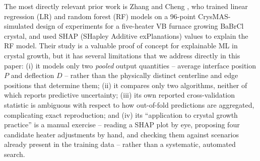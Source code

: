 \documentclass[conference]{IEEEtran}
\begin{document}
The most directly relevant prior work is Zhang and Cheng \cite{zhang_cheng2022}, who trained linear regression (LR) and random forest (RF) models on a 96-point CrysMAS-simulated design of experiments for a five-heater VB furnace growing BaBrCl crystal, and used SHAP (SHapley Additive exPlanations) values to explain the RF model. Their study is a valuable proof of concept for explainable ML in crystal growth, but it has several limitations that we address directly in this paper: (i) it models only two \emph{pooled} output quantities -- average interface position $P$ and deflection $D$ -- rather than the physically distinct centerline and edge positions that determine them; (ii) it compares only two algorithms, neither of which reports predictive uncertainty; (iii) its own reported cross-validation statistic is ambiguous with respect to how out-of-fold predictions are aggregated, complicating exact reproduction; and (iv) its ``application to crystal growth practice'' is a manual exercise -- reading a SHAP plot by eye, proposing four candidate heater adjustments by hand, and checking them against scenarios already present in the training data -- rather than a systematic, automated search.
\end{document}
